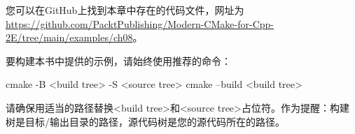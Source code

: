 您可以在GitHub上找到本章中存在的代码文件，网址为 \url{https://github.com/PacktPublishing/Modern-CMake-for-Cpp-2E/tree/main/examples/ch08}。

要构建本书中提供的示例，请始终使用推荐的命令：

\begin{shell}
cmake -B <build tree> -S <source tree>
cmake --build <build tree>
\end{shell}

请确保用适当的路径替换<build tree>和<source tree>占位符。作为提醒：构建树是目标/输出目录的路径，源代码树是您的源代码所在的路径。

























